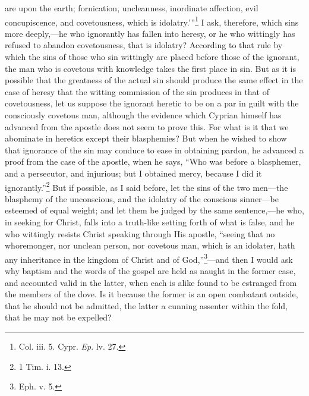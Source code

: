 are upon the earth; fornication, uncleanness, inordinate affection, evil concupiscence, and covetousness, which is idolatry.’''\footnote{\par  Col. iii. 5. Cypr. \emph{ Ep}. lv. 27.} I ask, therefore, which sins more deeply,—he who ignorantly has fallen into heresy, or he who wittingly has refused to abandon covetousness, that is idolatry? According to that rule by which the sins of those who sin wittingly are placed before those of the ignorant, the man who is covetous with knowledge takes the first place in sin. But as it is possible that the greatness of the actual sin should produce the same effect in the case of heresy that the witting commission of the sin produces in that of covetousness, let us suppose the ignorant heretic to be on a par in guilt with the consciously covetous man, although the evidence which Cyprian himself has advanced from the apostle does not seem to prove this. For what is it that we abominate in heretics except their blasphemies? But when he wished to show that ignorance of the sin may conduce to ease in obtaining pardon, he advanced a proof from the case of the apostle, when he says, ``Who was before a blasphemer, and a persecutor, and injurious; but I obtained mercy, because I did it ignorantly.''\footnote{\par  1 Tim. i. 13.} But if possible, as I said before, let the sins of the two men—the blasphemy of the unconscious, and the idolatry of the conscious sinner—be esteemed of equal weight; and let them be judged by the same sentence,—he who, in seeking for Christ, falls into a truth-like setting forth of what is false, and he who wittingly resists Christ speaking through His apostle, ``seeing that no whoremonger, nor unclean person, nor covetous man, which is an idolater, hath any inheritance in the kingdom of Christ and of God,''\footnote{\par  Eph. v. 5.}—and then I would ask why baptism and the words of the gospel are held as naught in the former case, and accounted valid in the latter, when each is alike found to be estranged from the members of the dove. Is it because the former is an open combatant outside, that he should not be admitted, the latter a cunning assenter within the fold, that he may not be expelled?


